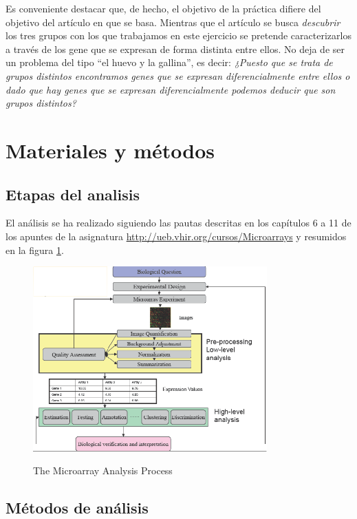 \documentclass[a4paper]{article}\usepackage[]{graphicx}\usepackage[]{color}
\begin{document}
Es conveniente destacar que, de hecho, el objetivo de la práctica difiere del objetivo del artículo en que se basa. Mientras que el artículo se busca  \emph{descubrir} los tres grupos con los que trabajamos en este ejercicio se pretende caracterizarlos a través de los gene que se expresan de forma distinta entre ellos. No deja de ser un problema del tipo ``el huevo y la gallina'', es decir: \emph{¿Puesto que se trata de grupos distintos encontramos genes que se expresan diferencialmente entre ellos o dado que hay genes que se expresan diferencialmente podemos deducir que son grupos distintos?}

\section{Materiales y métodos}

\subsection{Etapas del analisis}

El análisis se ha realizado siguiendo las pautas descritas en los capítulos 6 a 11 de los apuntes de la asignatura \url{http://ueb.vhir.org/cursos/Microarrays} y resumidos en la figura \ref{fig:pipeline}.

\begin{figure}[htbp]\begin{center}
\includegraphics[width=9cm]{images/analysisProcess}\\
\caption{The Microarray Analysis Process}\label{fig:pipeline}
\end{center}
\end{figure}

\subsection{Métodos de análisis}
\end{document}
